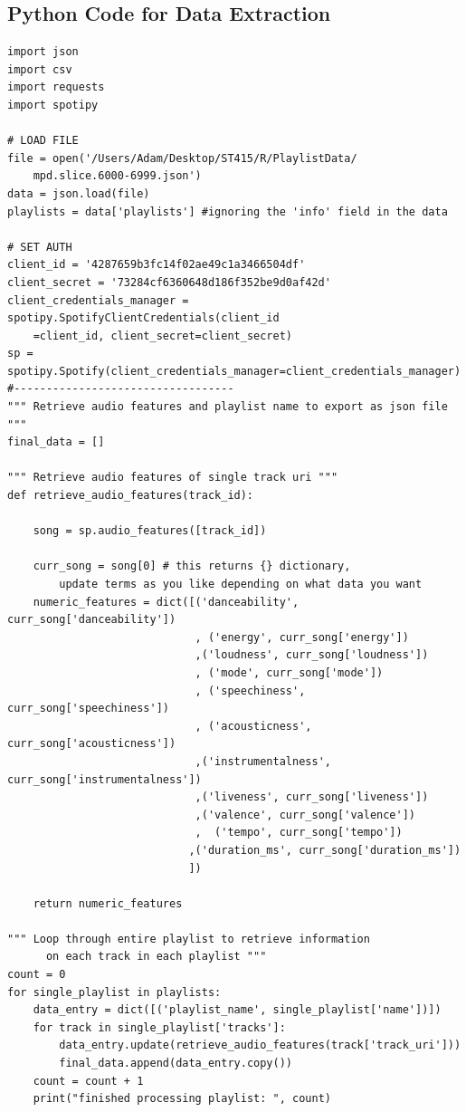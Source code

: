 \documentclass[12pt]{article}
\theoremstyle{plain}
\theoremstyle{definition}
\theoremstyle{remark}
\begin{document}
\newpage
\printbibliography[heading=bibintoc,title={References}]
\newpage


\begin{appendices}
\section{Python Code for Data Extraction}
\begin{verbatim}
import json
import csv
import requests
import spotipy

# LOAD FILE
file = open('/Users/Adam/Desktop/ST415/R/PlaylistData/
    mpd.slice.6000-6999.json')
data = json.load(file)
playlists = data['playlists'] #ignoring the 'info' field in the data

# SET AUTH
client_id = '4287659b3fc14f02ae49c1a3466504df'
client_secret = '73284cf6360648d186f352be9d0af42d'
client_credentials_manager = spotipy.SpotifyClientCredentials(client_id
    =client_id, client_secret=client_secret)
sp = spotipy.Spotify(client_credentials_manager=client_credentials_manager)
#----------------------------------
""" Retrieve audio features and playlist name to export as json file """
final_data = []

""" Retrieve audio features of single track uri """
def retrieve_audio_features(track_id):

    song = sp.audio_features([track_id])

    curr_song = song[0] # this returns {} dictionary, 
        update terms as you like depending on what data you want
    numeric_features = dict([('danceability', curr_song['danceability'])
                             , ('energy', curr_song['energy'])
                             ,('loudness', curr_song['loudness'])
                             , ('mode', curr_song['mode'])
                             , ('speechiness', curr_song['speechiness'])
                             , ('acousticness', curr_song['acousticness'])
                             ,('instrumentalness', curr_song['instrumentalness'])
                             ,('liveness', curr_song['liveness'])
                             ,('valence', curr_song['valence'])
                             ,  ('tempo', curr_song['tempo'])
                            ,('duration_ms', curr_song['duration_ms'])
                            ])

    return numeric_features

""" Loop through entire playlist to retrieve information 
      on each track in each playlist """
count = 0
for single_playlist in playlists:
    data_entry = dict([('playlist_name', single_playlist['name'])])
    for track in single_playlist['tracks']:
        data_entry.update(retrieve_audio_features(track['track_uri']))
        final_data.append(data_entry.copy()) 
    count = count + 1
    print("finished processing playlist: ", count)



\end{verbatim}
\end{appendices}
\end{document}
